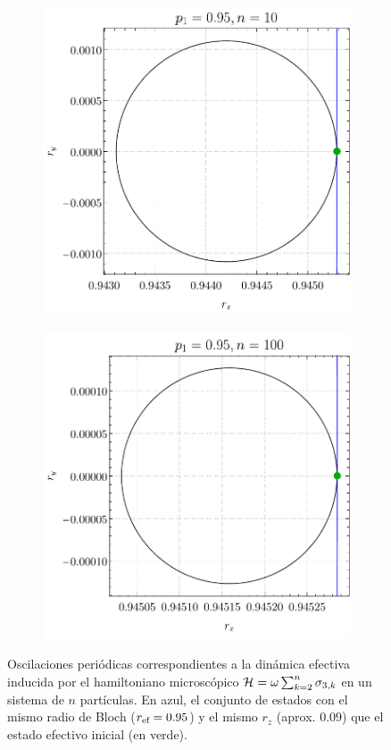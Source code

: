 \begin{figure}[ht!]
    \centering
    \begin{subfigure}{0.5\textwidth}
      \centering
      \includegraphics[width=0.9\linewidth]{chapter4/figures_separable/local_prefinv_eq_n=10_p=0.95.pdf}
    \end{subfigure}%
    \begin{subfigure}{0.5\textwidth}
      \centering
      \includegraphics[width=0.9\linewidth]{chapter4/figures_separable/local_prefinv_eq_n=100_p=0.95.pdf}
    \end{subfigure}
    \caption{Oscilaciones periódicas correspondientes a la dinámica efectiva inducida por el hamiltoniano microscópico $\mathcal{H}=\omega\sum_{k=2}^{n}\sigma_{3,k}$ en un sistema de $n$ partículas. En azul, el conjunto de estados con el mismo radio de Bloch ($r_{\text{ef}}=0.95$) y el mismo $r_{z}$ (aprox. $0.09$) que el estado efectivo inicial (en verde). \label{fig:OscilationsSameHam}}
\end{figure}

